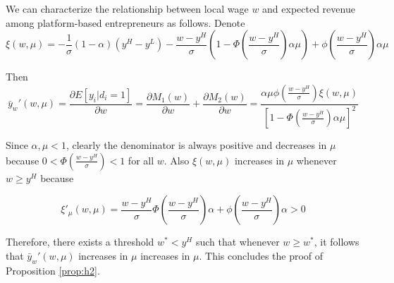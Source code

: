 \documentclass[letterpaper,12pt]{article}
\newtheorem{proposition}{Proposition}
\newtheorem{lemma}{Lemma}
\begin{document}
We can characterize the relationship between local wage $w$ and expected revenue among platform-based entrepreneurs as follows. Denote
$$\xi(w,\mu) = -\frac{1}{\sigma}(1-\alpha)(y^{H}-y^{L})-\frac{w-y^{H}}{\sigma}\left(1-\Phi\left(\frac{w-y^{H}}{\sigma}\right)\alpha\mu\right)+\phi\left(\frac{w-y^{H}}{\sigma}\right)\alpha\mu$$

Then
\begin{equation}
\bar{y}_{w}'(w,\mu) = \frac{\partial E\left[y_{i}\vert d_{i}=1\right]}{\partial w} = \frac{\partial M_{1}(w)}{\partial w} + \frac{\partial M_{2}(w)}{\partial w}= \frac{\alpha\mu\phi\left(\frac{w-y^{H}}{\sigma}\right)\xi(w,\mu)}{\left[1-\Phi\left(\frac{w-y^{H}}{\sigma}\right)\alpha\mu\right]^{2}}
\end{equation}



Since $\alpha,\mu<1$, clearly the denominator is always positive and decreases in $\mu$ because $0<\Phi(\frac{w-y^{H}}{\sigma})<1$ for all $w$. Also $\xi(w,\mu)$ increases in $\mu$ whenever $w\geq y^{H}$ because

$$\xi'_{\mu}(w,\mu)=\frac{w-y^{H}}{\sigma}\Phi\left(\frac{w-y^{H}}{\sigma}\right)\alpha+\phi\left(\frac{w-y^{H}}{\sigma}\right)\alpha>0$$

Therefore, there exists a threshold $w^{*}<y^{H}$ such that whenever $w\geq w^{*}$, it follows that $\bar{y}_{w}'(w,\mu)$ increases in $\mu$ increases in $\mu$. This concludes the proof of Proposition \ref{prop:h2}.





\end{document}
